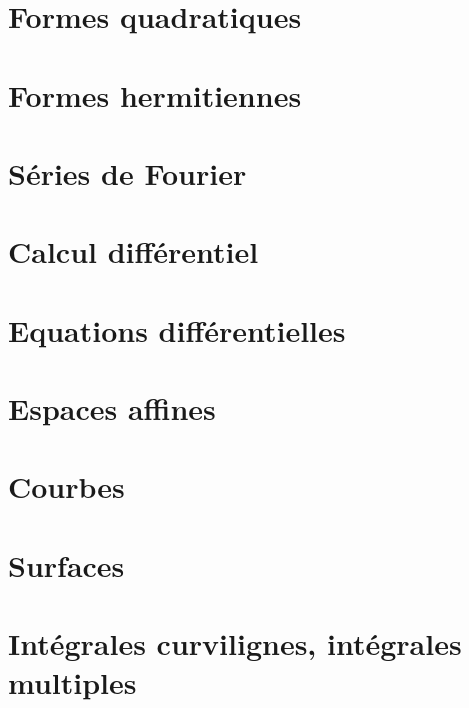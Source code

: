 \documentclass{MathBook}
\begin{document}


\chapter{Formes quadratiques }



%
\chapter{Formes hermitiennes }
\chapter{ Séries de Fourier }
\chapter{Calcul différentiel}


\chapter{Equations différentielles }
\chapter{Espaces affines }
\chapter{ Courbes }
\chapter{Surfaces }
\chapter{ Intégrales curvilignes, intégrales multiples }
\tableofcontents
\end{document}

